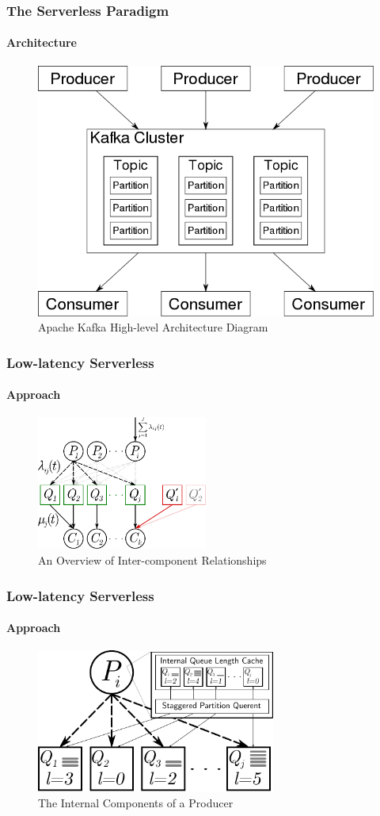 \documentclass[aspectratio=169]{beamer}
\begin{document}
\begin{frame}
	\frametitle{The Serverless Paradigm}
	\framesubtitle{Architecture}

	\begin{figure}
		\centering
		\includegraphics[width=0.5\linewidth]{kafka-arch}
		\caption{Apache Kafka High-level Architecture Diagram}
	\end{figure}
\end{frame}

\begin{frame}
	\frametitle{Low-latency Serverless}
	\framesubtitle{Approach}

	\begin{figure}[h]
		\centering
		\includegraphics[width=0.5\textwidth]{diagram}
		\caption{An Overview of Inter-component Relationships}
	\end{figure}
\end{frame}

\begin{frame}
	\frametitle{Low-latency Serverless}
	\framesubtitle{Approach}

	\begin{figure}[h]
		\centering
		\includegraphics[width=0.7\textwidth]{cache}
		\caption{The Internal Components of a Producer}
	\end{figure}
\end{frame}
\end{document}
